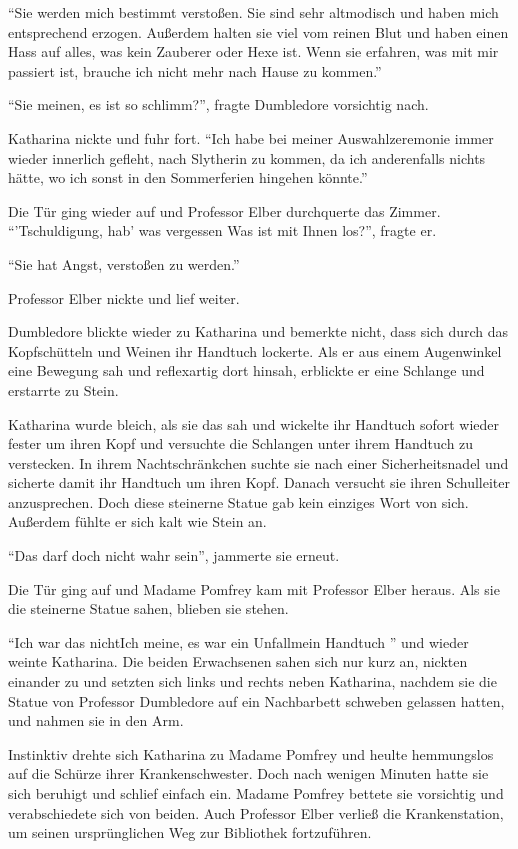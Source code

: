 \enquote{Sie werden mich bestimmt verstoßen. Sie sind sehr altmodisch und haben mich entsprechend erzogen. Außerdem halten sie viel vom reinen Blut und haben einen Hass auf alles, was kein Zauberer oder Hexe ist. Wenn sie erfahren, was mit mir passiert ist, brauche ich nicht mehr nach Hause zu kommen.}

\enquote{Sie meinen, es ist so schlimm?}, fragte Dumbledore vorsichtig nach.

Katharina nickte und fuhr fort. \enquote{Ich habe bei meiner Auswahlzeremonie immer wieder innerlich gefleht, nach Slytherin zu kommen, da ich anderenfalls nichts hätte, wo ich sonst in den Sommerferien hingehen könnte.}

Die Tür ging wieder auf und Professor Elber durchquerte das Zimmer. \enquote{’Tschuldigung, hab’ was vergessen \gst Was ist mit Ihnen los?}, fragte er.

\enquote{Sie hat Angst, verstoßen zu werden.}

Professor Elber nickte und lief weiter.

Dumbledore blickte wieder zu Katharina und bemerkte nicht, dass sich durch das Kopfschütteln und Weinen ihr Handtuch lockerte. Als er aus einem Augenwinkel eine Bewegung sah und reflexartig dort hinsah, erblickte er eine Schlange und erstarrte zu Stein.

Katharina wurde bleich, als sie das sah und wickelte ihr Handtuch sofort wieder fester um ihren Kopf und versuchte die Schlangen unter ihrem Handtuch zu verstecken. In ihrem Nachtschränkchen suchte sie nach einer Sicherheitsnadel und sicherte damit ihr Handtuch um ihren Kopf. Danach versucht sie ihren Schulleiter anzusprechen. Doch diese steinerne Statue gab kein einziges Wort von sich. Außerdem fühlte er sich kalt wie Stein an.

\enquote{Das darf doch nicht wahr sein}, jammerte sie erneut.

Die Tür ging auf und Madame Pomfrey kam mit Professor Elber heraus. Als sie die steinerne Statue sahen, blieben sie stehen.

\enquote{Ich war das nicht\abs Ich meine, es war ein Unfall\abs mein Handtuch \gst} und wieder weinte Katharina. Die beiden Erwachsenen sahen sich nur kurz an, nickten einander zu und setzten sich links und rechts neben Katharina, nachdem sie die Statue von Professor Dumbledore auf ein Nachbarbett schweben gelassen hatten, und nahmen sie in den Arm.

Instinktiv drehte sich Katharina zu Madame Pomfrey und heulte hemmungslos auf die Schürze ihrer Krankenschwester. Doch nach wenigen Minuten hatte sie sich beruhigt und schlief einfach ein. Madame Pomfrey bettete sie vorsichtig und verabschiedete sich von beiden. Auch Professor Elber verließ die Krankenstation, um seinen ursprünglichen Weg zur Bibliothek fortzuführen.


